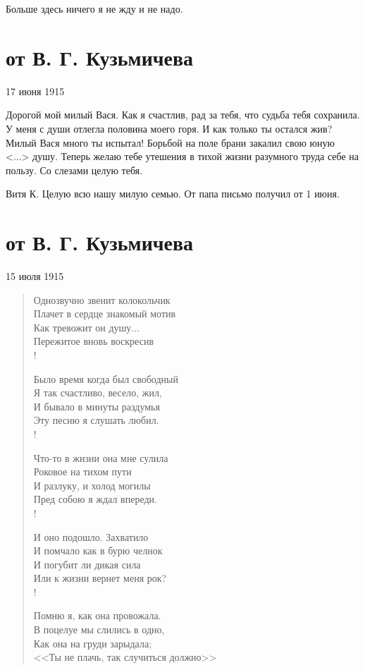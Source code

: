 \documentclass[]{memoir}
\begin{document}
Больше здесь ничего я не жду и не надо.

\section{от В. Г. Кузьмичева}
17 июня 1915

Дорогой мой милый Вася. Как я счастлив, рад за тебя, что судьба тебя сохранила. У меня с души отлегла половина моего горя. И как только ты остался жив? Милый Вася много ты испытал! Борьбой на поле брани закалил свою юную <...> душу. Теперь желаю тебе утешения в тихой жизни разумного труда себе на пользу. Со слезами целую тебя.

Витя К.
Целую всю нашу милую семью. От папа письмо получил от 1 июня.

\section{от В. Г. Кузьмичева}

15 июля 1915

\begin{verse}
Однозвучно звенит колокольчик\\
Плачет в сердце знакомый мотив\\
Как тревожит он душу...\\
Пережитое вновь воскресив\\!

Было время когда был свободный\\
Я так счастливо, весело, жил,\\
И бывало в минуты раздумья\\
Эту песню я слушать любил.\\!

Что-то в жизни она мне сулила\\
Роковое на тихом пути\\
И разлуку, и холод могилы\\
Пред собою я ждал впереди.\\!

И оно подошло. Захватило\\
И помчало как в бурю челнок\\
И погубит ли дикая сила\\
Или к жизни вернет меня рок?\\!

Помню я, как она провожала.\\
В поцелуе мы слились в одно,\\
Как она на груди зарыдала;\\
<<Ты не плачь, так случиться должно>>
\end{verse}
\end{document}
